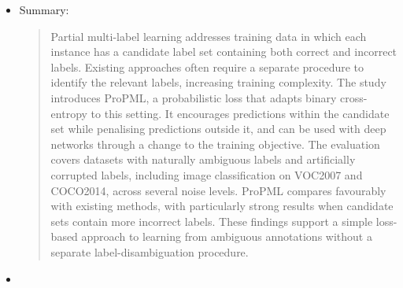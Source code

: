 \begin{itemize}[parsep=0pt,itemsep=0pt]
    Summary:
    \begin{quote}
    Computer-aided analysis of lung computed tomography (CT) scans often addresses individual processing stages, leaving their integration into patient-level assessment unresolved. The study introduces CompLung, a pipeline combining lung segmentation, suspicious-region detection, patch representation learning, and patient-level classification. It uses multiple instance learning to aggregate information from candidate regions into a prediction for the complete scan. The evaluation uses LIDC-IDRI, extended with radiologist-produced lung segmentation masks made available for further research. For patient-level classification using a malignancy-score threshold greater than three, CompLung achieves an area under the receiver operating characteristic curve of 0.90, compared with 0.83 for the strongest reported baselines. Qualitative analyses also examine the regions contributing to predictions. The study demonstrates the benefit of integrating the processing stages for prediction of radiologist-derived labels and provides segmentation annotations to support subsequent work on automated CT analysis.
    \end{quote}
    \item {}
    
    Summary:
    \begin{quote}
    Partial multi-label learning addresses training data in which each instance has a candidate label set containing both correct and incorrect labels. Existing approaches often require a separate procedure to identify the relevant labels, increasing training complexity. The study introduces ProPML, a probabilistic loss that adapts binary cross-entropy to this setting. It encourages predictions within the candidate set while penalising predictions outside it, and can be used with deep networks through a change to the training objective. The evaluation covers datasets with naturally ambiguous labels and artificially corrupted labels, including image classification on VOC2007 and COCO2014, across several noise levels. ProPML compares favourably with existing methods, with particularly strong results when candidate sets contain more incorrect labels. These findings support a simple loss-based approach to learning from ambiguous annotations without a separate label-disambiguation procedure.
    \end{quote}
    \item {}


\end{itemize}
